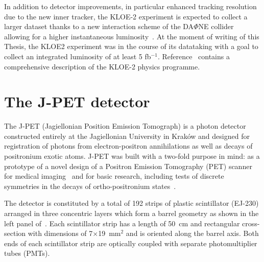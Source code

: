 In addition to detector improvements, in particular enhanced tracking resolution due to the new inner tracker, the KLOE-2 experiment is expected to collect a larger dataset thanks to a new interaction scheme of the DA$\Phi$NE collider allowing for a higher instantaneous luminosity~\cite{Zobov:2007xw}. At the moment of writing of this Thesis, the KLOE2 experiment was in the course of its datataking with a goal to collect an integrated luminosity of at least 5 fb$^{-1}$. Reference~\cite{kloe2_general} contains a comprehensive description of the KLOE-2 physics programme.

\section{The J-PET detector}\label{sec:jpet}
The J-PET (Jagiellonian Position Emission Tomograph) is a photon detector constructed entirely at the Jagiellonian University in Krak\'ow and designed for registration of photons from electron-positron annihilations as well as decays of positronium exotic atoms. J-PET was built with a two-fold purpose in mind: as a prototype of a novel design of a Positron Emission Tomography (PET) scanner for medical imaging~\cite{moskal_patent} and for basic research, including tests of discrete symmetries in the decays of ortho-positronium states~\cite{moskal_potential}.

The detector is constituted by a total of 192 strips of plastic scintillator (EJ-230) arranged in three concentric layers which form a barrel geometry as shown in the left panel of~. Each scintillator strip has a length of 50~cm and rectangular cross-section with dimensions of 7$\times$19~mm$^2$ and is oriented along the barrel axis. Both ends of each scintillator strip are optically coupled with separate photomultiplier tubes (PMTs).

